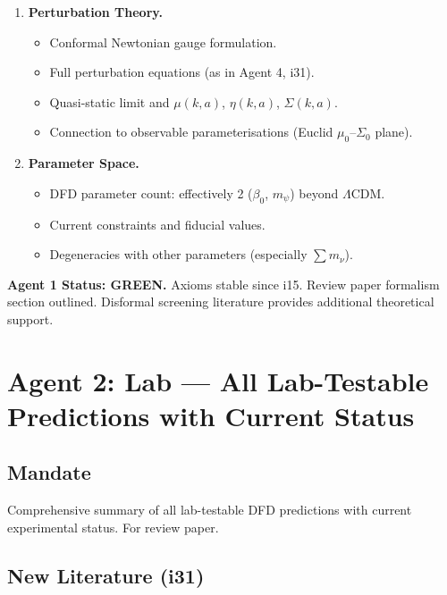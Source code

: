 \documentclass[11pt,a4paper]{article}
\newcommand{\GREEN}{\textcolor{dfdgreen}{\textbf{GREEN}}}
\begin{document}
\begin{enumerate}
\item[2.5] \textbf{Perturbation Theory.}
\begin{itemize}
\item Conformal Newtonian gauge formulation.
\item Full perturbation equations (as in Agent 4, i31).
\item Quasi-static limit and $\mu(k,a)$, $\eta(k,a)$, $\Sigma(k,a)$.
\item Connection to observable parameterisations (Euclid $\mu_0$--$\Sigma_0$ plane).
\end{itemize}

\item[2.6] \textbf{Parameter Space.}
\begin{itemize}
\item DFD parameter count: effectively 2 ($\beta_0$, $m_\psi$) beyond $\Lambda$CDM.
\item Current constraints and fiducial values.
\item Degeneracies with other parameters (especially $\sum m_\nu$).
\end{itemize}
\end{enumerate}

\textbf{Agent 1 Status: \GREEN.} Axioms stable since i15. Review paper formalism section outlined. Disformal screening literature provides additional theoretical support.

\section{Agent 2: Lab --- All Lab-Testable Predictions with Current Status}

\subsection{Mandate}
Comprehensive summary of all lab-testable DFD predictions with current experimental status. For review paper.

\subsection{New Literature (i31)}
\end{document}
